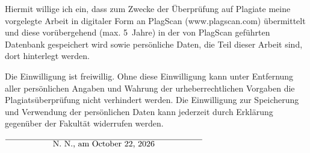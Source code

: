 \documentclass[12pt,twoside,a4paper,parskip]{scrbook}
\def\BaAuthor{Lennard Rose, Jochen Schmidt, Moritz Zeitler}
\def\ShowBaAuthor{\BaAuthor}
\def\ShowBaAuthor{N.~N.}
\begin{document}

Hiermit willige ich ein, dass zum Zwecke der Überprüfung auf Plagiate meine vorgelegte Arbeit in digitaler Form an PlagScan (www.plagscan.com) übermittelt und diese vorübergehend (max. 5~Jahre) in der von PlagScan geführten Datenbank gespeichert wird sowie persönliche Daten, die Teil dieser Arbeit sind, dort hinterlegt werden.

\begin{small}
Die Einwilligung ist freiwillig. Ohne diese Einwilligung kann unter Entfernung aller persönlichen Angaben und Wahrung der urheberrechtlichen Vorgaben die Plagiatsüberprüfung nicht verhindert werden. Die Einwilligung zur Speicherung und Verwendung der persönlichen Daten kann jederzeit durch Erklärung gegenüber der Fakultät widerrufen werden.
\end{small}

\vspace{20pt}
\begin{flushright}
$\overline{~~~~~~~~~~~~~~~~~\mbox{\ShowBaAuthor, am \today}~~~~~~~~~~~~~~~~~}$
\end{flushright}
\end{document}
